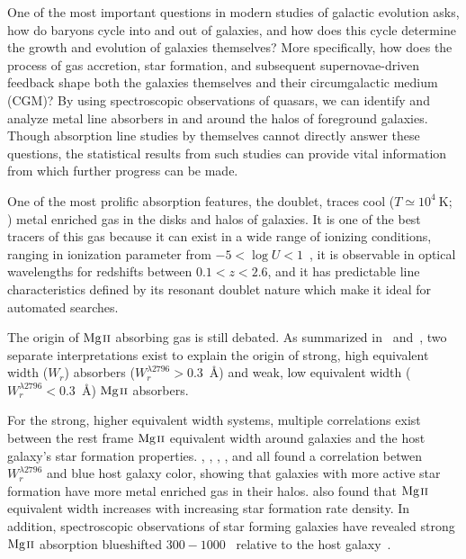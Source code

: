 \documentclass[iop,apj,numberedappendix,appendixfloats,twocolappendix]{emulateapj}
\begin{document}
One of the most important questions in modern studies of galactic evolution asks, how do baryons cycle into and out of galaxies, and how does this cycle determine the growth and evolution of galaxies themselves? More specifically, how does the process of gas accretion, star formation, and subsequent supernovae-driven feedback shape both the galaxies themselves and their circumgalactic medium (CGM)? By using spectroscopic observations of quasars, we can identify and analyze metal line absorbers in and around the halos of foreground galaxies. Though absorption line studies by themselves cannot directly answer these questions, the statistical results from such studies can provide vital information from which further progress can be made.

One of the most prolific absorption features, the {\MgIIdblt} doublet, traces cool ($T \simeq 10^4~\mathrm{K}$; \cite{Churchill2003}) metal enriched gas in the disks and halos of galaxies. It is one of the best tracers of this gas because it can exist in a wide range of ionizing conditions, ranging in ionization parameter from $-5 < \log U < 1$~\citep{Churchill1999}, it is observable in optical wavelengths for redshifts between $0.1 < z < 2.6$, and it has predictable line characteristics defined by its resonant doublet nature which make it ideal for automated searches.

The origin of ${\hbox{{\rm Mg}\kern 0.1em{\sc ii}}}$ absorbing gas is still debated. As summarized in~\cite{Kacprzak2011} and~\cite{Matejek2013}, two separate interpretations exist to explain the origin of strong, high equivalent width ($W_r$) {\MgII} absorbers ($W_r^{\lambda2796} > 0.3$~{\AA}) and weak, low equivalent width ($W_r^{\lambda2796} < 0.3$~{\AA}) ${\hbox{{\rm Mg}\kern 0.1em{\sc ii}}}$ absorbers.

For the strong, higher equivalent width systems, multiple correlations exist between the rest frame ${\hbox{{\rm Mg}\kern 0.1em{\sc ii}}}$ equivalent width around galaxies and the host galaxy's star formation properties. \cite{Zibetti2007}, \cite{Lundgren2009}, \cite{Noterdaeme2010}, \cite{Bordoloi2011}, and \cite{Nestor2011} all found a correlation betwen $W_r^{\lambda2796}$ and blue host galaxy color, showing that galaxies with more active star formation have more metal enriched gas in their halos. \cite{Bordoloi2014} also found that ${\hbox{{\rm Mg}\kern 0.1em{\sc ii}}}$ equivalent width increases with increasing star formation rate density. In addition, spectroscopic observations of star forming galaxies have revealed strong ${\hbox{{\rm Mg}\kern 0.1em{\sc ii}}}$ absorption blueshifted $300 - 1000$~{\kms} relative to the host galaxy~\citep{Tremonti2007,Weiner2009,Martin2009,Rubin2010}.
\end{document}
